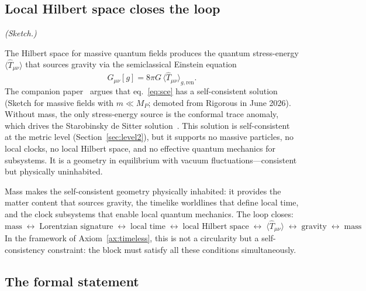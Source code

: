 \documentclass[12pt,a4paper]{article}
\theoremstyle{definition}
\theoremstyle{remark}
\begin{document}
\subsection{Local Hilbert space closes the loop}
\label{sec:hilbert_mass}

\emph{(Sketch.)}

\medskip

\noindent The Hilbert space for massive quantum fields produces the
quantum stress-energy $\langle\hat{T}_{\mu\nu}\rangle$ that sources
gravity via the semiclassical Einstein equation
\begin{equation}
G_{\mu\nu}[g] = 8\pi G\,\langle\hat{T}_{\mu\nu}\rangle_{g,\mathrm{ren}}.
\label{eq:sce}
\end{equation}
The companion paper~\cite{fixed_point} argues that eq.~\eqref{eq:sce}
has a self-consistent solution (Sketch for massive fields with
$m \ll M_P$; demoted from Rigorous in June 2026). Without mass, the only stress-energy source is the conformal
trace anomaly, which drives the Starobinsky de Sitter
solution~\cite{starobinsky}. This solution is self-consistent at the
metric level (Section~\ref{sec:level2}), but it supports no massive
particles, no local clocks, no local Hilbert space, and no effective
quantum mechanics for subsystems. It is a geometry in equilibrium with
vacuum fluctuations---consistent but physically uninhabited.

Mass makes the self-consistent geometry physically inhabited: it provides
the matter content that sources gravity, the timelike worldlines that
define local time, and the clock subsystems that enable local quantum
mechanics. The loop closes:
\begin{equation}
\text{mass} \;\longleftrightarrow\; \text{Lorentzian signature}
\;\longleftrightarrow\; \text{local time}
\;\longleftrightarrow\; \text{local Hilbert space}
\;\longleftrightarrow\; \langle\hat{T}_{\mu\nu}\rangle
\;\longleftrightarrow\; \text{gravity}
\;\longleftrightarrow\; \text{mass}
\label{eq:co_emergence}
\end{equation}
In the framework of Axiom~\ref{ax:timeless}, this is not a circularity
but a self-consistency constraint: the block must satisfy all these
conditions simultaneously.

\subsection{The formal statement}
\label{sec:formal_coemergence}
\end{document}
